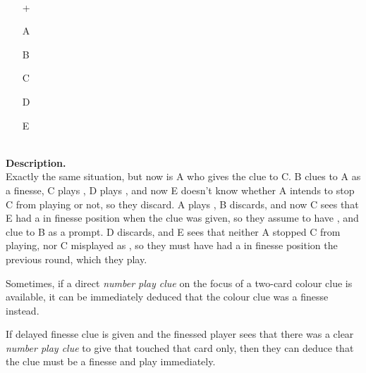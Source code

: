 \begin{example}	\hfill \\
	\begin{minipage}{0.45\textwidth}
		\begin{itemize}
			\item[\Large +]      
			\item[\Large A]    
			\item[\Large B]    
			\item[\Large C]    
			\item[\Large D]    
			\item[\Large E]    
		\end{itemize}
	\end{minipage}%
	\begin{minipage}{0.55\textwidth}
		\hfill \\
		
		\textbf{Description.} \\
		
		Exactly the same situation, but now is A who gives the  clue to C. B clues  to A as a finesse, C plays , D plays , and now E doesn't know whether A intends to stop C from playing  or not, so they discard. A plays , B discards, and now C sees that E had a  in finesse position when the  clue was given, so they assume to have , and clue  to B as a prompt. D discards, and E sees that neither A stopped C from playing, nor C misplayed  as , so they must have had a  in finesse position the previous round, which they play.
	\end{minipage}
\end{example} \vspace{0.15 cm}

Sometimes, if a direct \emph{number play clue} on the focus of a two-card colour clue is available, it can be immediately deduced that the colour clue was a finesse instead.

\begin{convention}
	\label{anticipated-delayed-finesse}
	If delayed finesse clue is given and the finessed player sees that there was a clear \emph{number play clue} to give that touched that card only, then they can deduce that the clue must be a finesse and play immediately.
\end{convention}

